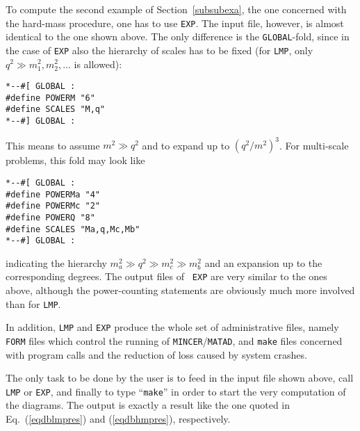To compute the second example of Section~\ref{subsubexa},
the one concerned with
the hard-mass procedure, one has to use {\tt EXP}. The input file,
however, is almost identical to the one shown above. The only difference
is the {\tt GLOBAL}-fold, since in the case of {\tt EXP} also the hierarchy
of scales has to be fixed (for {\tt LMP}, only $q^2\gg
m_1^2,m_2^2,\ldots$ is allowed):
\begin{verbatim}
*--#[ GLOBAL :
#define POWERM "6"
#define SCALES "M,q"
*--#] GLOBAL :
\end{verbatim}
This means to assume $m^2\gg q^2$ and to expand up to $(q^2/m^2)^3$. For
multi-scale problems, this fold may look like
\begin{verbatim}
*--#[ GLOBAL :
#define POWERMa "4"
#define POWERMc "2"
#define POWERQ "8"
#define SCALES "Ma,q,Mc,Mb"
*--#] GLOBAL :
\end{verbatim}
indicating the hierarchy $m_a^2\gg q^2\gg m_c^2\gg m_b^2$ and an
expansion up to the corresponding degrees.  The output files of {\tt
  EXP} are very similar to the ones above, although the power-counting
statements are obviously much more involved than for {\tt LMP}.

In addition, {\tt LMP} and {\tt EXP} produce the whole set of
administrative files, namely {\tt FORM} files which control the running of
{\tt MINCER}/{\tt MATAD}, and {\tt make} files concerned with program
calls and the reduction of loss caused by system crashes.

The only task to be done by the user is to feed in the input file shown
above, call {\tt LMP} or {\tt EXP}, and finally to type ``{\tt make}''
in order to start the very computation of the diagrams. The output is
exactly a result like the one quoted in Eq.~(\ref{eqdblmpres}) and
(\ref{eqdbhmpres}), respectively.

